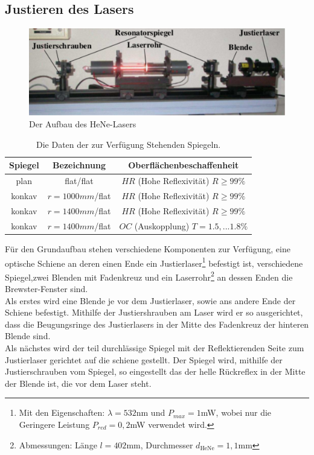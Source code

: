 \subsection{Justieren des Lasers}
\begin{figure}[h!]
\centering
\includegraphics[scale=0.75]{../Grafiken/Aufbau.pdf}
\caption{Der Aufbau des HeNe-Lasers\cite{V61}}\label{Aufbau}
\end{figure}
\begin{table}[h!]
\centering
\begin{tabular}{c c c}
Spiegel & Bezeichnung & Oberflächenbeschaffenheit \\\hline
plan & flat/flat & $HR$ (Hohe Reflexivität) $R\ge 99\%$\\
konkav & $r=1000mm$/flat & $HR$ (Hohe Reflexivität) $R\ge 99\%$\\
konkav & $r=1400mm$/flat & $HR$ (Hohe Reflexivität) $R\ge 99\%$\\
konkav & $r=1400mm$/flat & $OC$ (Auskopplung) $T=1.5,...1.8\% $
\end{tabular}
\caption{Die Daten der zur Verfügung Stehenden Spiegeln.\cite{V61}\label{Eigenschaften}}
\end{table}
Für den Grundaufbau stehen verschiedene Komponenten zur Verfügung, eine optische Schiene an deren einen Ende ein Justierlaser\footnote{Mit den Eigenschaften: $\lambda=532$nm und $P_{max}=1$mW, wobei nur die Geringere Leistung $P_{red}=0,2$mW verwendet wird.} befestigt ist, verschiedene Spiegel,zwei Blenden mit Fadenkreuz und ein Laserrohr\footnote{Abmessungen: Länge $l=402$mm, Durchmesser $d_{\text{HeNe}}=1,1$mm} an dessen Enden die Brewster-Fenster sind.\\ 
Als erstes wird eine Blende je vor dem Justierlaser, sowie ans andere Ende der Schiene befestigt. Mithilfe der Justiershrauben am Laser wird er so ausgerichtet, dass die Beugungsringe des Justierlasers in der Mitte des Fadenkreuz der hinteren Blende sind.\\
Als nächstes wird der teil durchlässige Spiegel mit der Reflektierenden Seite zum Justierlaser gerichtet auf die schiene gestellt. Der Spiegel wird, mithilfe der Justierschrauben vom Spiegel, so eingestellt das der helle Rückreflex in der Mitte der Blende ist, die vor dem Laser steht.\\ 

